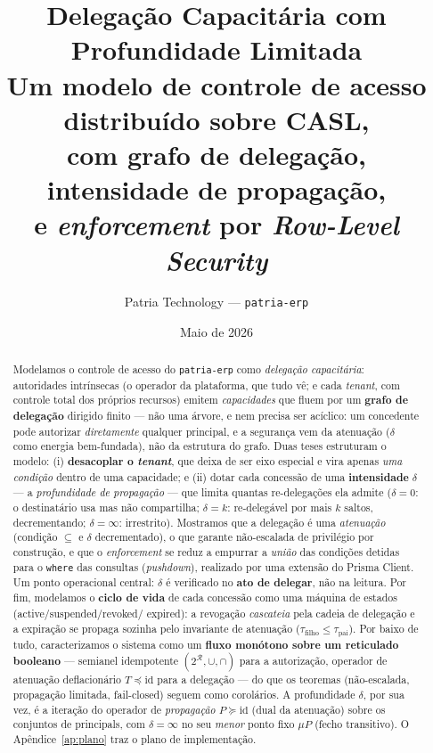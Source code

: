 \documentclass[11pt,a4paper]{article}
\title{\textbf{Delegação Capacitária com Profundidade Limitada}\\[2mm]
\large Um modelo de controle de acesso distribuído sobre CASL,\\
com grafo de delegação, intensidade de propagação,\\
e \emph{enforcement} por \emph{Row-Level Security}}
\author{Patria Technology --- \texttt{patria-erp}}
\date{Maio de 2026}
\theoremstyle{definition}
\newcommand{\R}{\mathcal{R}}
\newcommand{\dep}{\delta}
\begin{document}
\maketitle

\begin{abstract}
Modelamos o controle de acesso do \texttt{patria-erp} como \emph{delegação
capacitária}: autoridades intrínsecas (o operador da plataforma, que tudo
vê; e cada \emph{tenant}, com controle total dos próprios recursos) emitem
\emph{capacidades} que fluem por um \textbf{grafo de delegação} dirigido
finito --- não uma árvore, e nem precisa ser acíclico: um concedente pode
autorizar \emph{diretamente} qualquer principal, e a segurança vem da
atenuação ($\dep$ como energia bem-fundada), não da estrutura do grafo.
Duas teses estruturam o modelo: (i) \textbf{desacoplar o \emph{tenant}},
que deixa de ser eixo especial e vira apenas \emph{uma condição} dentro de
uma capacidade; e (ii) dotar cada concessão de uma \textbf{intensidade}
$\dep$ --- a \emph{profundidade de propagação} --- que limita quantas
re-delegações ela admite ($\dep=0$: o destinatário usa mas não compartilha;
$\dep=k$: re-delegável por mais $k$ saltos, decrementando; $\dep=\infty$:
irrestrito). Mostramos que a delegação é uma \emph{atenuação} (condição
$\subseteq$ e $\dep$ decrementado), o que garante não-escalada de
privilégio por construção, e que o \emph{enforcement} se reduz a empurrar a
\emph{união} das condições detidas para o \texttt{where} das consultas
(\emph{pushdown}), realizado por uma extensão do Prisma Client. Um ponto
operacional central: $\dep$ é verificado no \textbf{ato de delegar}, não na
leitura. Por fim, modelamos o \textbf{ciclo de vida} de cada concessão como
uma máquina de estados (\textsf{active}/\textsf{suspended}/\textsf{revoked}/
\textsf{expired}): a revogação \emph{cascateia} pela cadeia de delegação e a
expiração se propaga sozinha pelo invariante de atenuação
($\tau_{\text{filho}}\le\tau_{\text{pai}}$). Por baixo de tudo,
caracterizamos o sistema como um \textbf{fluxo monótono sobre um reticulado
booleano} --- semianel idempotente $(2^{\R},\cup,\cap)$ para a autorização,
operador de atenuação deflacionário $T\preceq\mathrm{id}$ para a delegação ---
do que os teoremas (não-escalada, propagação limitada, fail-closed) seguem
como corolários. A profundidade $\dep$, por sua vez, é a iteração do operador
de \emph{propagação} $P\succeq\mathrm{id}$ (dual da atenuação) sobre os
conjuntos de principals, com $\dep=\infty$ no seu \emph{menor} ponto fixo
$\mu P$ (fecho transitivo). O Apêndice~\ref{ap:plano} traz o plano de
implementação.
\end{abstract}
\end{document}
